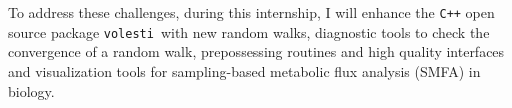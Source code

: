\documentclass[a4paper, 12pt]{article}
\def \c++{{\tt C++}}
\def\volesti{{\tt volesti}}
\def\cran{{\tt CRAN}}
\def\R{{\tt R}}
\begin{document}




To address these challenges, during this internship, I will enhance the {\tt C++} open source package \volesti\ with new random walks, diagnostic tools to check the convergence of a random walk, prepossessing routines and high quality interfaces and visualization tools for sampling-based metabolic flux analysis (SMFA) in biology. 






\end{document}
